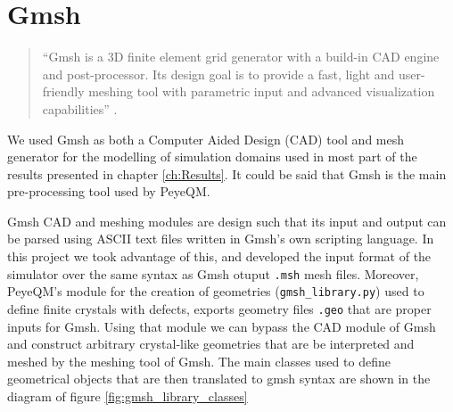 \section{Gmsh}
\begin{quote}
``Gmsh is a 3D finite element grid generator with a build-in CAD engine and post-processor. Its design goal is to provide a fast, light and user-friendly meshing tool with parametric input and advanced visualization capabilities'' \cite{Geuzaine2009}. 
\end{quote}
We used Gmsh as both a Computer Aided Design (CAD) tool and mesh generator for the modelling of simulation domains used in most part of the results presented in chapter \ref{ch:Results}. It could be said that Gmsh is the main pre-processing tool used by PeyeQM.

Gmsh CAD and meshing modules are design such that its input and output can be parsed using ASCII text files written in Gmsh's own scripting language. In this project we took advantage of this, and developed the input format of the simulator over the same syntax as Gmsh otuput \verb|.msh| mesh files. Moreover, PeyeQM's module for the creation of geometries (\verb|gmsh_library.py|) used to define finite crystals with defects, exports geometry files \verb|.geo| that   are proper inputs for Gmsh. Using that module we can bypass the CAD module of Gmsh and construct arbitrary crystal-like geometries that are be interpreted and meshed by the meshing tool of Gmsh. The main classes used to define geometrical objects that are then translated to gmsh syntax are shown in the diagram of figure \ref{fig:gmsh_library_classes}


